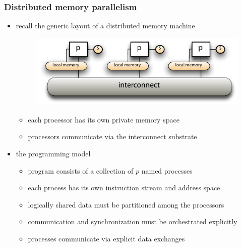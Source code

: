 %
%
%
%


\begin{frame}[fragile]
%
  \frametitle{Distributed memory parallelism}
%
  \begin{itemize}
%
  \item recall the generic layout of a distributed memory machine
%
    \begin{figure}
      \centering
      \includegraphics[scale=1.0]{figures/distributed-memory.pdf}
    \end{figure}
    \vspace{-1.0em}
%
    \begin{itemize}
      \item each processor has its own private memory space
      \item processors communicate via the interconnect substrate
    \end{itemize}
%
  \item the programming model
    \begin{itemize}
    \item program consists of a collection of $p$ named processes
      \item each process has its own instruction stream and address space
    \item logically shared data must be partitioned among the processors
    \item communication and synchronization must be orchestrated explicitly 
    \item processes communicate via explicit data exchanges
    \end{itemize}
%
  \end{itemize}
%
\end{frame}

